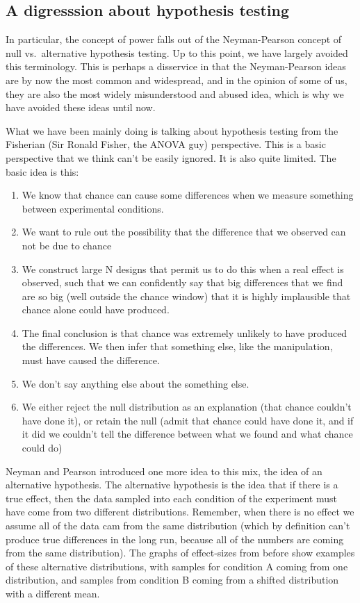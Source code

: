 \documentclass[
  letterpaper,
  DIV=11,
  numbers=noendperiod]{scrreprt}
\providecommand{\tightlist}{%
  \setlength{\itemsep}{0pt}\setlength{\parskip}{0pt}}\usepackage{longtable,booktabs,array}
\begin{document}
\subsection{A digresssion about hypothesis
testing}\label{a-digresssion-about-hypothesis-testing-1}

In particular, the concept of power falls out of the Neyman-Pearson
concept of null vs.~alternative hypothesis testing. Up to this point, we
have largely avoided this terminology. This is perhaps a disservice in
that the Neyman-Pearson ideas are by now the most common and widespread,
and in the opinion of some of us, they are also the most widely
misunderstood and abused idea, which is why we have avoided these ideas
until now.

What we have been mainly doing is talking about hypothesis testing from
the Fisherian (Sir Ronald Fisher, the ANOVA guy) perspective. This is a
basic perspective that we think can't be easily ignored. It is also
quite limited. The basic idea is this:

\begin{enumerate}
\def\labelenumi{\arabic{enumi}.}
\tightlist
\item
  We know that chance can cause some differences when we measure
  something between experimental conditions.
\item
  We want to rule out the possibility that the difference that we
  observed can not be due to chance
\item
  We construct large N designs that permit us to do this when a real
  effect is observed, such that we can confidently say that big
  differences that we find are so big (well outside the chance window)
  that it is highly implausible that chance alone could have produced.
\item
  The final conclusion is that chance was extremely unlikely to have
  produced the differences. We then infer that something else, like the
  manipulation, must have caused the difference.
\item
  We don't say anything else about the something else.
\item
  We either reject the null distribution as an explanation (that chance
  couldn't have done it), or retain the null (admit that chance could
  have done it, and if it did we couldn't tell the difference between
  what we found and what chance could do)
\end{enumerate}

Neyman and Pearson introduced one more idea to this mix, the idea of an
alternative hypothesis. The alternative hypothesis is the idea that if
there is a true effect, then the data sampled into each condition of the
experiment must have come from two different distributions. Remember,
when there is no effect we assume all of the data cam from the same
distribution (which by definition can't produce true differences in the
long run, because all of the numbers are coming from the same
distribution). The graphs of effect-sizes from before show examples of
these alternative distributions, with samples for condition A coming
from one distribution, and samples from condition B coming from a
shifted distribution with a different mean.
\end{document}
